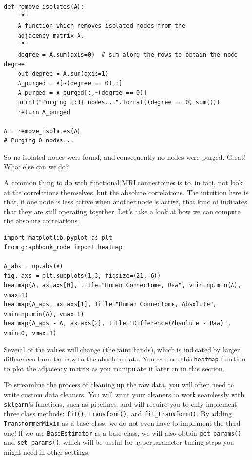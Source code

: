 \begin{lstlisting}[style=python]
def remove_isolates(A):
    """
    A function which removes isolated nodes from the 
    adjacency matrix A.
    """
    degree = A.sum(axis=0)  # sum along the rows to obtain the node degree
    out_degree = A.sum(axis=1)
    A_purged = A[~(degree == 0),:]
    A_purged = A_purged[:,~(degree == 0)]
    print("Purging {:d} nodes...".format((degree == 0).sum()))
    return A_purged
    
A = remove_isolates(A)
# Purging 0 nodes...
\end{lstlisting}

So no isolated nodes were found, and consequently no nodes were purged. Great! What else can we do?

A common thing to do with functional MRI connectomes is to, in fact, not look at the correlations themselves, but the absolute correlations. The intuition here is that, if one node is less active when another node is active, that kind of indicates that they are still operating together. Let's take a look at how we can compute the absolute correlations:

\begin{lstlisting}[style=python]
import matplotlib.pyplot as plt
from graphbook_code import heatmap

A_abs = np.abs(A)
fig, axs = plt.subplots(1,3, figsize=(21, 6))
heatmap(A, ax=axs[0], title="Human Connectome, Raw", vmin=np.min(A), vmax=1)
heatmap(A_abs, ax=axs[1], title="Human Connectome, Absolute", vmin=np.min(A), vmax=1)
heatmap(A_abs - A, ax=axs[2], title="Difference(Absolute - Raw)", vmin=0, vmax=1)
\end{lstlisting}

Several of the values will change (the faint bands), which is indicated by larger differences from the raw to the absolute data. You can use this \texttt{heatmap} function to plot the adjacency matrix as you manipulate it later on in this section.

To streamline the process of cleaning up the raw data, you will often need to write custom data cleaners. You will want your cleaners to work seamlessly with \texttt{sklearn}'s functions, such as pipelines, and will require you to only implement three class methods: \texttt{fit()}, \texttt{transform()}, and \texttt{fit\_transform()}. By adding \texttt{TransformerMixin} as a base class, we do not even have to implement the third one! If we use \texttt{BaseEstimator} as a base class, we will also obtain \texttt{get\_params()} and \texttt{set\_params()}, which will be useful for hyperparameter tuning steps you might need in other settings. 

